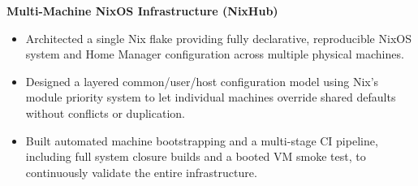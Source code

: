 \textbf{Multi-Machine NixOS Infrastructure (NixHub)}
\begin{itemize}
  \item Architected a single Nix flake providing fully declarative, reproducible NixOS system and Home Manager configuration across multiple physical machines.
  \item Designed a layered common/user/host configuration model using Nix's module priority system to let individual machines override shared defaults without conflicts or duplication.
  \item Built automated machine bootstrapping and a multi-stage CI pipeline, including full system closure builds and a booted VM smoke test, to continuously validate the entire infrastructure.
\end{itemize}
